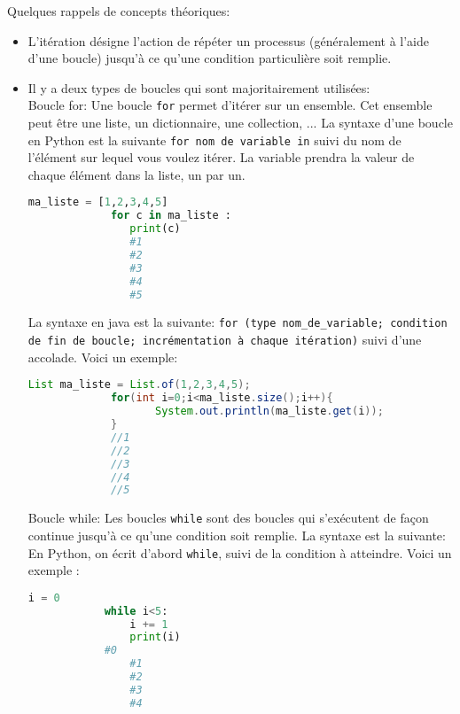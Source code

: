     Quelques rappels de concepts théoriques: \\
    
    \begin{itemize}
    	\item L'itération désigne l'action de répéter un processus (généralement à l'aide d'une boucle) jusqu'à ce qu'une condition particulière soit remplie.
    	\item Il y a deux types de boucles qui sont majoritairement utilisées: \\
    	
    	Boucle for: Une boucle \lstinline{for} permet d'itérer sur un ensemble. Cet ensemble peut être une liste, un dictionnaire, une collection, ... La syntaxe d'une boucle en Python est la suivante \lstinline{for nom de variable in} suivi du nom de l'élément sur lequel vous voulez itérer. La variable prendra la valeur de chaque élément dans la liste, un par un. \\
    	
    	\begin{lstlisting}[language=Python]
             ma_liste = [1,2,3,4,5]
             for c in ma_liste :
             	print(c)
             	#1
             	#2
             	#3
             	#4
             	#5 \end{lstlisting}
             	
     	La syntaxe en java est la suivante: \lstinline{for (type nom_de_variable; condition de fin de boucle; incrémentation à chaque itération)} suivi d'une accolade. Voici un exemple: \\
     	
     	\begin{lstlisting}[language=Java]
             List ma_liste = List.of(1,2,3,4,5);
             for(int i=0;i<ma_liste.size();i++){
            		System.out.println(ma_liste.get(i));
             }
             //1
             //2
             //3
             //4
             //5
        	 \end{lstlisting}
        	 
        Boucle while: Les boucles \lstinline{while} sont des boucles qui s’exécutent de façon continue jusqu’à ce qu’une condition soit remplie. La syntaxe est la suivante: En Python, on écrit d’abord \lstinline{while}, suivi de la condition à atteindre. Voici un exemple : \\
     	
     	\begin{lstlisting}[language=Python]
                i = 0
    		while i<5:
        		i += 1
        		print(i)
        	#0
            	#1
            	#2
            	#3
            	#4 \end{lstlisting}
     	

\end{itemize}
